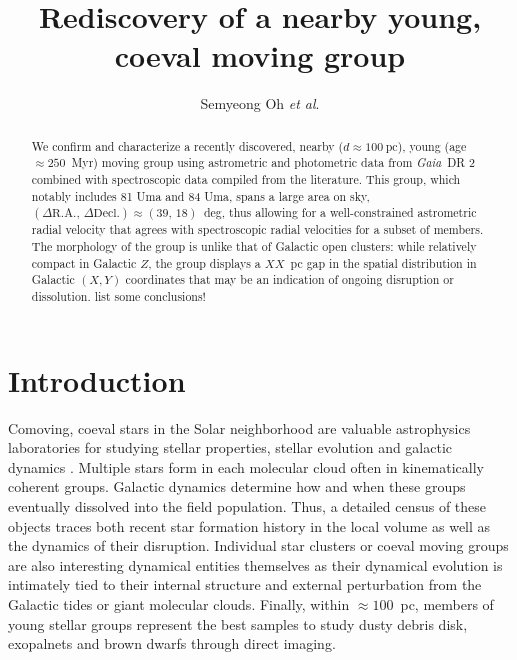 \documentclass[modern,letterpaper]{aastex61}
\newcommand{\project}[1]{\textsl{#1}}
\newcommand{\gaia}{\project{Gaia}}
\newcommand{\etal}{\textit{et al}.}
\newcommand{\todo}[1]{{\color{crimson}#1}}
\newcommand{\groupDistanceEstimate}{\ensuremath{100~\mathrm{pc}}}
\begin{document}
\sloppy\sloppypar\raggedbottom\frenchspacing %

\title{
  Rediscovery of a nearby young, coeval moving group
}

\author[0000-0001-7790-5308]{Semyeong Oh \etal}


\begin{abstract}

  We confirm and characterize a recently discovered, nearby ($d \approx \groupDistanceEstimate$), young (age$\approx 250$~Myr) moving group using astrometric and photometric data from \gaia\ DR 2 combined with spectroscopic data compiled from the literature.
  This group, which notably includes 81 Uma and 84 Uma, spans a large area
  on sky, $(\Delta\mathrm{R.A.},\,\Delta\mathrm{Decl.})\approx(39,\,18)$~deg,
  thus allowing for a well-constrained astrometric radial velocity that agrees with spectroscopic radial velocities for a subset of members.
  The morphology of the group is unlike that of Galactic open clusters: while relatively compact in Galactic $Z$, the group displays a $XX$~pc gap in the spatial distribution in Galactic $(X, Y)$ coordinates that may be an indication of ongoing disruption or dissolution.
  \todo{list some conclusions!}

\end{abstract}

\section{Introduction} %
\label{sec:introduction}

Comoving, coeval stars in the Solar neighborhood are valuable astrophysics
laboratories for studying stellar properties, stellar evolution and galactic
dynamics \citep[e.g.,][]{2018arXiv180409378G,2018MNRAS.tmp.1228M}.
Multiple stars form in each molecular cloud often in kinematically coherent
groups.
Galactic dynamics determine how and when these groups eventually  dissolved into
the field population.
Thus, a detailed census of these objects traces both recent star formation
history in the local volume as well as the dynamics of their disruption.
Individual star clusters or coeval moving groups are also interesting dynamical
entities themselves as their dynamical evolution is intimately tied to their
internal structure and external perturbation from the Galactic tides or giant
molecular clouds.
Finally, within $\approx 100$~pc, members of young stellar groups represent the
best samples to study dusty debris disk, exopalnets and brown dwarfs through
direct imaging.
\end{document}
